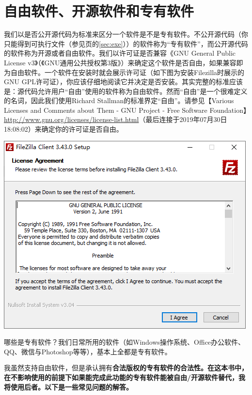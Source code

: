 \section{自由软件、开源软件和专有软件}
我们以是否公开源代码为标准来区分一个软件是不是专有软件。不公开源代码（你只能得到可执行文件（参见\pageref{sec:exe}页的\ref{sec:exe}））的软件称为“专有软件”，而公开源代码的软件称为开源或者自由软件。我们以许可证是否兼容《GNU General Public License v3》（《GNU通用公共授权第3版》）来确定这个软件是否自由，如果兼容即为自由软件。一个软件在安装时就会展示许可证（如下图为安装Filezilla时展示的GNU GPL许可证），你应该仔细地阅读它并决定是否安装。其实完整的标准应该是：源代码允许用户“自由”使用的软件称为自由软件。然而“自由”是一个很难定义的名词，因此我们使用Richard Stallman的标准界定“自由”。请参见【Various Licenses and Comments about Them - GNU Project - Free Software Foundation】\url{http://www.gnu.org/licenses/license-list.html}（最后连接于2019年07月30日18:08:02）来确定你的许可证是否自由。
\begin{center}
	\includegraphics[scale=0.6]{pic/fzi}
\end{center}\par
哪些是专有软件？我们日常所用的软件（如Windows操作系统、Office办公软件、QQ、微信与Photoshop等等），基本上全都是专有软件。\par
我虽然支持自由软件，但是承认拥有\bf 合法版权\normalall 的专有软件的合法性。在这本书中，在\bf 不影响使用\normalall 的前提下如果能完成此功能的专有软件能被自由/开源软件替代，我将使用后者。以下是一些常见问题的解答。
